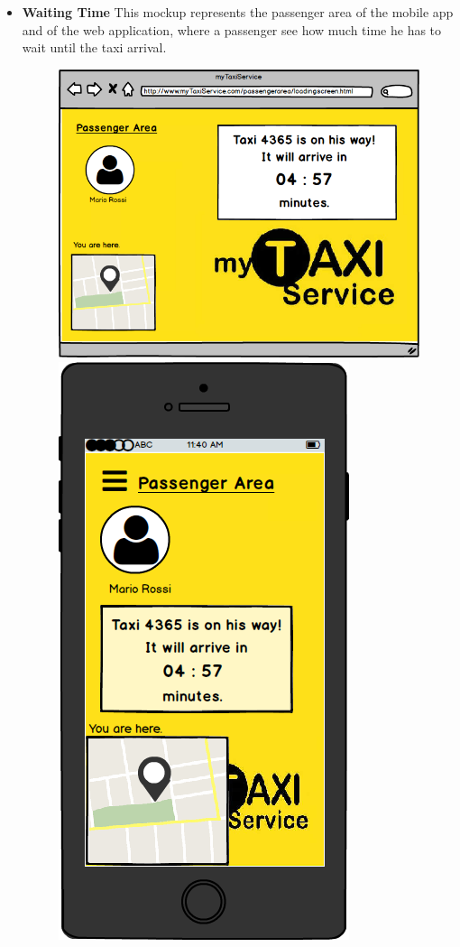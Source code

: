 \documentclass[18pt,oneside,a4paper, titlepage]{article}
\begin{document}
\begin{itemize}
\begin{figure}[h]
				\end{figure}
				\\ \\ 
				\item \textbf{Waiting Time} This mockup represents the passenger area of the mobile app and of the web application, where a passenger see how much time he has to wait until the taxi arrival.\\
				\begin{figure}[h]
					\includegraphics[scale=0.3]{WebAppTaxiIsArriving.png}%
					\qquad\qquad
					\includegraphics[scale=0.3]{MobileAppTaxiIsArriving.png}

\end{figure}
\end{itemize}
\end{document}

